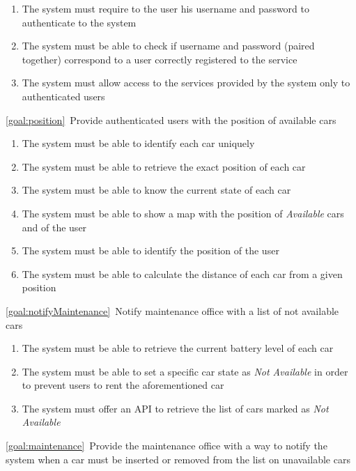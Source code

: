 \begin{description}
\begin{enumerate}[label=\textbf{R\arabic*}]
  				\item The system must require to the user his username and password to authenticate to
  				the system
   				\item The system must be able to check if username and password (paired together)
   				correspond to a user correctly registered to the service
   				\item The system must allow access to the services provided by the system only to
   				authenticated users 
			\end{enumerate}
		\item \ref{goal:position}\ Provide authenticated users with the position of available cars
			\begin{enumerate}[label=\textbf{R\arabic*}]
				\item The system must be able to identify each car uniquely
  				\item The system must be able to retrieve the exact position of each car
   				\item The system must be able to know the current state of each car
   				\item The system must be able to show a map with the position of \textit{Available} cars
   				and of the user
  				\item The system must be able to identify the position of the user
   				\item The system must be able to calculate the distance of each car from a given position
  			\end{enumerate}
		\item \ref{goal:notifyMaintenance}\ Notify maintenance office with a list of not available cars
			\begin{enumerate}[label=\textbf{R\arabic*}]
   				\item The system must be able to retrieve the current battery level of each car
   				\item The system must be able to set a specific car state as \textit{Not Available} in order
   				to prevent users to rent the aforementioned car
   				\item The system must offer an API to retrieve the list of cars marked as \textit{Not
   				Available}
  			\end{enumerate}
		\item \ref{goal:maintenance}\ Provide the maintenance office with a way to notify the system
		when a car must be inserted or removed from the list on unavailable cars
			\begin{enumerate}[label=\textbf{R\arabic*}]

\end{enumerate}
\end{description}
